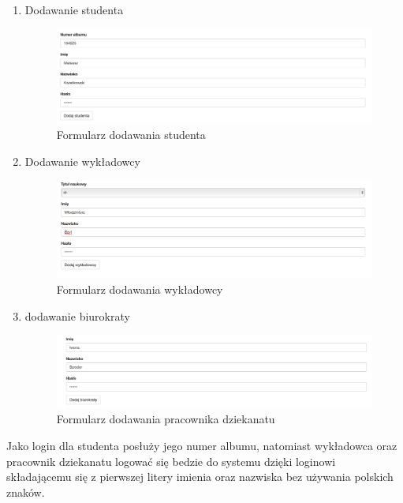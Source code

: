 \documentclass{xmgr}
\begin{document}
\begin{enumerate}
\item Dodawanie studenta

\begin{figure}[th!]
\centering
\includegraphics[width=1.1\hsize]{images/addNewStudent} 
\caption{Formularz dodawania studenta\label{RYS.7}}
\end{figure}

\item Dodawanie wykładowcy

\begin{figure}[th!]
\centering
\includegraphics[width=0.9\hsize]{images/addTeacher} 
\caption{Formularz dodawania wykładowcy\label{RYS.8}}
\end{figure}
\newpage
\item dodawanie biurokraty

\begin{figure}[th!]
\centering
\includegraphics[width=0.7\hsize]{images/addBiurokrata} 
\caption{Formularz dodawania pracownika dziekanatu\label{RYS.9}}
\end{figure}

\end{enumerate}

Jako login dla studenta posłuży jego numer albumu, natomiast wykładowca oraz pracownik dziekanatu logować się bedzie do systemu  dzięki loginowi składającemu się z pierwszej litery imienia oraz nazwiska bez używania polskich znaków.
\end{document}
